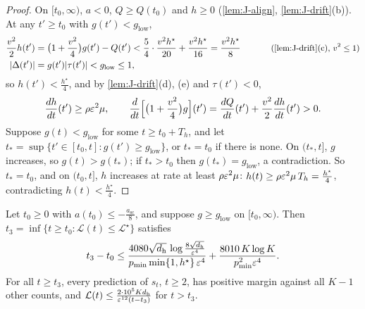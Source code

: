 \begin{proof}
On $[t_0,\infty)$, $a<0$, $Q\ge Q(t_0)$ and $h\ge0$ (\cref{lem:J-align}, \cref{lem:J-drift}(b)). At any $t'\ge t_0$ with $g(t')<g_{\mathrm{low}}$,
\begin{alignat*}{2}
 \tfrac{v^2}{2}h(t')&=\bigl(1+\tfrac{v^2}{4}\bigr)g(t')-Q(t')<\tfrac{5}{4}\cdot\tfrac{v^2h^\star}{20}+\tfrac{v^2h^\star}{16}=\tfrac{v^2h^\star}{8} &\qquad& \why{\cref{lem:J-drift}(c), $v^2\le1$}\\
 |\Delta(t')|&=g(t')|\tau(t')|<g_{\mathrm{low}}\le1,
\end{alignat*}
so $h(t')<\frac{h^\star}{4}$, and by \cref{lem:J-drift}(d), (e) and $\tau(t')<0$,
\[
 \ddt{h}(t')\ge\rho\initscale^2\mu,\qquad \frac{d}{dt}\Bigl[\bigl(1+\tfrac{v^2}{4}\bigr)g\Bigr](t')=\ddt{Q}(t')+\tfrac{v^2}{2}\ddt{h}(t')>0 .
\]
Suppose $g(t)<g_{\mathrm{low}}$ for some $t\ge t_0+T_h$, and let $t_\ast=\sup\{t'\in[t_0,t]:g(t')\ge g_{\mathrm{low}}\}$, or $t_\ast=t_0$ if there is none. On $(t_\ast,t]$, $g$
increases, so $g(t)>g(t_\ast)$; if $t_\ast>t_0$ then $g(t_\ast)=g_{\mathrm{low}}$, a contradiction. So $t_\ast=t_0$, and on $(t_0,t]$, $h$ increases at rate at least
$\rho\varepsilon^2\mu$: $h(t)\ge\rho\varepsilon^2\mu\,T_h=\frac{h^\star}{4}$, contradicting $h(t)<\frac{h^\star}{4}$.
\end{proof}

\begin{lemma}
\label{lem:J-grow}
Let $t_0\ge0$ with $a(t_0)\le-\frac{a_{\mathrm{sc}}}{8}$, and suppose $g\ge g_{\mathrm{low}}$ on $[t_0,\infty)$. Then $t_3=\inf\{t\ge t_0:\mathcal L(t)\le\mathcal L^\star\}$ satisfies
\[
 t_3-t_0\le\frac{4080\sqrt{d_{\mathrm h}}\,\log\frac{8\sqrt{d_{\mathrm h}}}{\varepsilon^4}}{p_{\min}\min\{1,h^\star\}\,\varepsilon^4}+\frac{8010\,K\log K}{p_{\min}^2\varepsilon^4} .
\]
For all $t\ge t_3$, every prediction of $s_t$, $t\ge2$, has positive margin against all $K-1$ other counts, and
$\mathcal L(t)\le\frac{2\cdot10^5Kd_{\mathrm h}}{\varepsilon^{12}(t-t_3)}$ for $t>t_3$.
\end{lemma}

